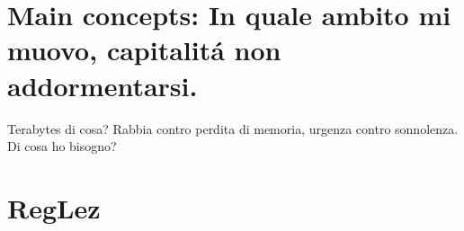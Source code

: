 \section{Main concepts: In quale ambito mi muovo, capitalit\'a non addormentarsi.}

\begin{frame}{Terabytes di cosa?}
Rabbia contro perdita di memoria, urgenza contro sonnolenza. Di cosa ho bisogno?
\end{frame}

\section{RegLez}
